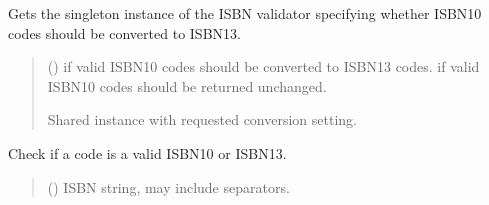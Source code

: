 \documentclass[letterpaper,10pt,english]{sphinxmanual}
\begin{document}
\begin{fulllineitems}
\begin{fulllineitems}
\label{\detokenize{apache_commons_validator_python.routines:apache_commons_validator_python.routines.isbn_validator.ISBNValidator.get_instance}}
\pysigstartsignatures
{}
\pysigstopsignatures
\sphinxAtStartPar
Gets the singleton instance of the ISBN validator specifying whether ISBN\sphinxhyphen{}10
codes should be converted to ISBN\sphinxhyphen{}13.
\begin{quote}\begin{description}
\sphinxAtStartPar
{} () \textendash{}  if valid ISBN\sphinxhyphen{}10 codes should be converted to ISBN\sphinxhyphen{}13 codes.
 if valid ISBN\sphinxhyphen{}10 codes should be returned unchanged.

\sphinxAtStartPar
Shared instance with requested conversion setting.

\sphinxAtStartPar
{\hyperref[\detokenize{apache_commons_validator_python.routines:apache_commons_validator_python.routines.isbn_validator.ISBNValidator}]{}}

\end{description}\end{quote}

\end{fulllineitems}


\begin{fulllineitems}
\label{\detokenize{apache_commons_validator_python.routines:apache_commons_validator_python.routines.isbn_validator.ISBNValidator.is_valid}}
\pysigstartsignatures
{}
\pysigstopsignatures
\sphinxAtStartPar
Check if a code is a valid ISBN\sphinxhyphen{}10 or ISBN\sphinxhyphen{}13.
\begin{quote}\begin{description}
\sphinxAtStartPar
{} () \textendash{} ISBN string, may include separators.


\end{description}
\end{quote}
\end{fulllineitems}
\end{fulllineitems}
\end{document}
